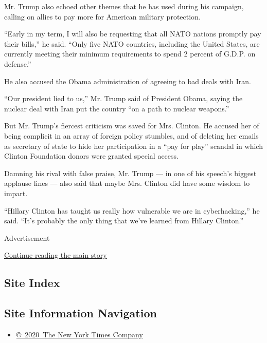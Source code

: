 Mr. Trump also echoed other themes that he has used during his campaign,
calling on allies to pay more for American military protection.

``Early in my term, I will also be requesting that all NATO nations
promptly pay their bills,'' he said. ``Only five NATO countries,
including the United States, are currently meeting their minimum
requirements to spend 2 percent of G.D.P. on defense.''

He also accused the Obama administration of agreeing to bad deals with
Iran.

``Our president lied to us,'' Mr. Trump said of President Obama, saying
the nuclear deal with Iran put the country ``on a path to nuclear
weapons.''

But Mr. Trump's fiercest criticism was saved for Mrs. Clinton. He
accused her of being complicit in an array of foreign policy stumbles,
and of deleting her emails as secretary of state to hide her
participation in a ``pay for play'' scandal in which Clinton Foundation
donors were granted special access.

Damning his rival with false praise, Mr. Trump --- in one of his
speech's biggest applause lines --- also said that maybe Mrs. Clinton
did have some wisdom to impart.

``Hillary Clinton has taught us really how vulnerable we are in
cyberhacking,'' he said. ``It's probably the only thing that we've
learned from Hillary Clinton.''

Advertisement

\protect\hyperlink{after-bottom}{Continue reading the main story}

\hypertarget{site-index}{%
\subsection{Site Index}\label{site-index}}

\hypertarget{site-information-navigation}{%
\subsection{Site Information
Navigation}\label{site-information-navigation}}

\begin{itemize}
\tightlist
\item
  \href{https://help.nytimes.com/hc/en-us/articles/115014792127-Copyright-notice}{©~2020~The
  New York Times Company}
\end{itemize}

